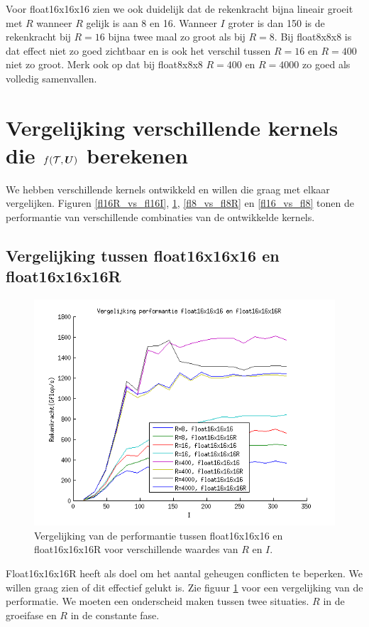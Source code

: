Voor float16x16x16 zien we ook duidelijk dat de rekenkracht bijna lineair groeit met $R$ wanneer $R$ gelijk is aan 8 en 16. Wanneer $I$ groter is dan 150 is de rekenkracht bij $R=16$ bijna twee maal zo groot als bij $R=8$. Bij float8x8x8 is dat effect niet zo goed zichtbaar en is ook het verschil tussen $R=16$ en $R=400$ niet zo groot. Merk ook op dat bij float8x8x8 $R=400$ en $R=4000$ zo goed als volledig samenvallen.






\section{Vergelijking verschillende kernels die $f(\mathcal{T}, \boldsymbol{U})$ berekenen}
We hebben verschillende kernels ontwikkeld en willen die graag met elkaar vergelijken. Figuren \ref{fl16R_vs_fl16I}, \ref{fl16_vs_fl16R}, \ref{fl8_vs_fl8R} en \ref{fl16_vs_fl8} tonen de performantie van verschillende combinaties van de ontwikkelde kernels.

\subsection{Vergelijking tussen float16x16x16 en float16x16x16R}
\begin{figure}[h!]
\centering
\includegraphics{fl16_vs_fl16R}
\caption{\label{fl16_vs_fl16R} Vergelijking van de performantie tussen float16x16x16 en float16x16x16R voor verschillende waardes van $R$ en $I$.}
\end{figure}

Float16x16x16R heeft als doel om het aantal geheugen conflicten te beperken. We willen graag zien of dit effectief gelukt is. Zie figuur \ref{fl16_vs_fl16R} voor een vergelijking van de performatie. We moeten een onderscheid maken tussen twee situaties. $R$ in de groeifase en $R$ in de constante fase.

